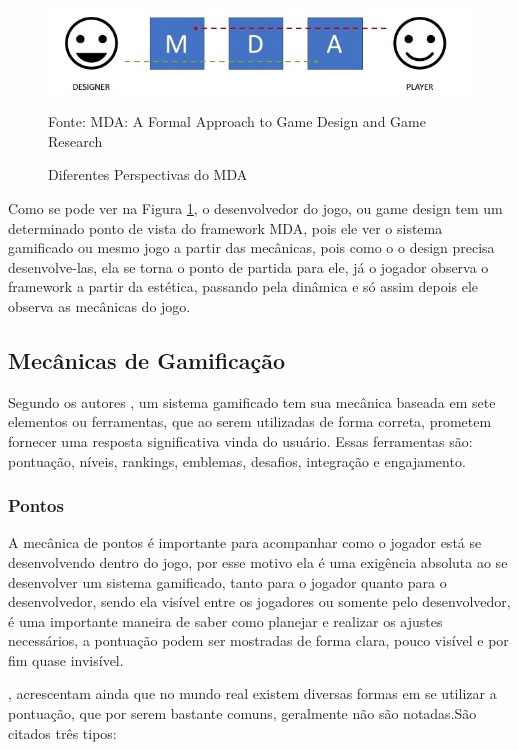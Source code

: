 		\begin{figure}[H]
				\centering
				\includegraphics[width=1\linewidth]{img/pespectivasMDA}
				\caption{Diferentes Perspectivas do MDA}
				Fonte: MDA: A Formal Approach to Game Design and Game Research
				\label{visaoMDA}
		\end{figure}
	Como se pode ver na Figura \ref{visaoMDA}, o desenvolvedor do jogo, ou game design tem um determinado ponto de vista do framework MDA, pois ele ver o sistema gamificado ou mesmo jogo a partir das mecânicas, pois como o o design precisa desenvolve-las, ela se torna o ponto de partida para ele, já o jogador observa o framework a partir da estética, passando pela dinâmica e só assim depois ele observa as mecânicas do jogo.
	
	\subsection{Mecânicas de Gamificação}
	Segundo os autores  , um sistema gamificado tem sua mecânica baseada em sete elementos ou ferramentas, que ao serem utilizadas de forma correta, prometem fornecer uma resposta significativa vinda do usuário. Essas ferramentas são: pontuação, níveis, rankings, emblemas, desafios, integração e engajamento.
	
		\subsubsection{Pontos}
		A mecânica de pontos é importante para acompanhar como o jogador está se desenvolvendo dentro do jogo, por esse motivo ela é uma exigência absoluta ao se desenvolver um sistema gamificado, tanto para o jogador quanto para o desenvolvedor, sendo ela visível entre os jogadores ou somente pelo desenvolvedor, é uma importante maneira de saber como planejar e realizar os ajustes necessários,  a pontuação podem ser mostradas de forma clara, pouco visível e por fim quase invisível.\cite{zichermann2011gamification}
	   
	 , acrescentam ainda que no mundo real existem diversas formas em se utilizar a pontuação, que por serem bastante comuns, geralmente não são notadas.São citados três tipos:
	 
